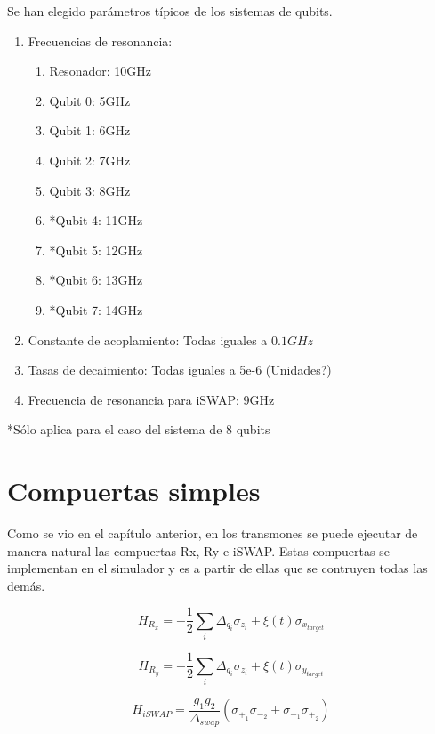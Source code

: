 Se han elegido parámetros típicos de los sistemas de qubits\cite{blais}.

\begin{enumerate}
    \item Frecuencias de resonancia:
        \begin{enumerate}
            \item Resonador: 10GHz
            \item Qubit 0: 5GHz
            \item Qubit 1: 6GHz
            \item Qubit 2: 7GHz
            \item Qubit 3: 8GHz
            \item *Qubit 4: 11GHz
            \item *Qubit 5: 12GHz
            \item *Qubit 6: 13GHz
            \item *Qubit 7: 14GHz
        \end{enumerate}
    \item Constante de acoplamiento: Todas iguales a $0.1 GHz$
    \item Tasas de decaimiento: Todas iguales a 5e-6 (Unidades?)
    \item Frecuencia de resonancia para iSWAP: 9GHz
\end{enumerate}

*Sólo aplica para el caso del sistema de 8 qubits

\section{Compuertas simples}

Como se vio en el capítulo anterior, en los transmones se puede ejecutar de manera natural las compuertas Rx, Ry e iSWAP. Estas compuertas se implementan en el simulador y es a partir de ellas que se contruyen todas las demás.

\begin{equation}
    H_{R_x} = -\frac{1}{2} \sum\limits_i \Delta_{q_i} \sigma_{z_i} + \xi(t) \sigma_{x_{target}}
\end{equation}

\begin{equation}
    H_{R_y} = -\frac{1}{2} \sum\limits_i \Delta_{q_i} \sigma_{z_i} + \xi(t) \sigma_{y_{target}}
\end{equation}

\begin{equation}
    H_{iSWAP} = \frac{g_1 g_2}{\Delta_{swap}} (\sigma_{+_1} \sigma_{-_2} + \sigma_{-_1} \sigma_{+_2})
\end{equation}

